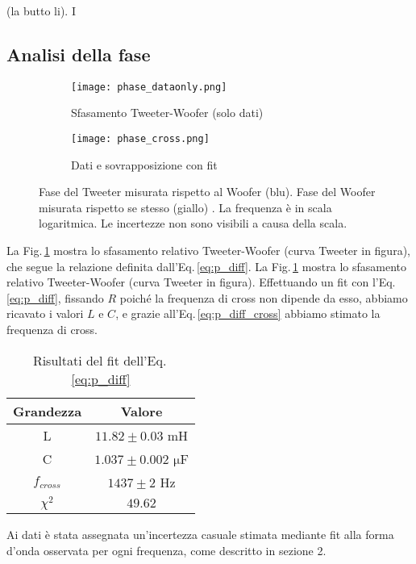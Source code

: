 \documentclass[../Relazione_circuiti]{subfiles}
\begin{document}
 (la butto li). I
  


\subsection{Analisi della fase}

  \begin{figure}[H]
    \centering

    \begin{subfigure}{=0.49\textwidth}
      \centering
      \texttt{[image: phase\_dataonly.png]}
      \caption{Sfasamento Tweeter-Woofer (solo dati)}
      \label{fig: pdiff_dataonly}

    \end{subfigure}
    \hfill
    \begin{subfigure}{=0.49\textwidth}
      \centering
      \texttt{[image: phase\_cross.png]}
      \caption{Dati e sovrapposizione con fit}
      \label{fig: pdiff_fit_data}

    \end{subfigure}

    \caption{Fase del Tweeter misurata rispetto al Woofer (blu). Fase del Woofer misurata rispetto se stesso (giallo)
      . La frequenza è in scala logaritmica. Le incertezze non sono visibili a causa della scala.}
    \label{fig: phase_diff}

  \end{figure}

  La Fig.\,\ref{fig: pdiff_dataonly} mostra lo sfasamento relativo Tweeter-Woofer (curva Tweeter in figura), che segue la
  relazione definita dall'Eq.\,\eqref{eq:p_diff}.
  La Fig.\,\ref{fig: pdiff_dataonly} mostra lo sfasamento relativo Tweeter-Woofer (curva Tweeter in figura).
  Effettuando un fit con l'Eq.\,\eqref{eq:p_diff}, fissando $R$
      poiché la frequenza di cross non dipende da esso, abbiamo
      ricavato i valori $L$ e $C$, e grazie all'Eq.\,\eqref{eq:p_diff_cross} abbiamo stimato la frequenza di cross.


  \begin{table}[H]
    \centering

\begin{tabular}{c | c }
Grandezza & Valore  \\
\hline
L & $ 11.82 \pm 0.03 $  mH \\
C & $ 1.037 \pm 0.002 $  $\mathrm{\mu}$F \\
$f_{cross}$ & $ 1437 \pm 2$  Hz \\
$\chi^2$ & $49.62$ 

    \end{tabular}
    \caption{Risultati del fit dell'Eq.\,\eqref{eq:p_diff}}
    \label{tab:fit_phase}

  \end{table}
  Ai dati è stata assegnata un'incertezza casuale stimata mediante fit alla forma d'onda osservata per ogni frequenza,
  come descritto in sezione 2.
\end{document}
